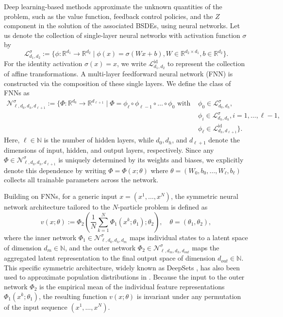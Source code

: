 \documentclass[11pt]{article}
\numberwithin{equation}{section}
\theoremstyle{plain}
\theoremstyle{definition}
\theoremstyle{remark}
\newcommand{\R}{\mathbb{R}}
\begin{document}
	Deep learning-based methods approximate the unknown quantities of the problem, such as the value function, feedback control policies, and the $Z$ component in the solution of the associated BSDEs, using neural networks.  Let us denote the collection of single-layer neural networks with activation function $\sigma$ by 
	\begin{equation*}
		\mathcal{L}_{d_1, d_2}^\sigma := \big\{ \phi:\R^{d_1} \to \R^{d_2}\mid \phi(x) = \sigma(Wx +b), W\in \R^{d_2\times d_1}, b\in \R^{d_2} \big\}. 
	\end{equation*}
	For the identity activation $\sigma(x)=x$, we write $\mathcal{L}_{d_1, d_2}^{\mathrm{id}}$ to represent the collection of affine transformations. A multi-layer feedforward neural network (FNN) is constructed via the composition of these single layers. We define the class of FNNs as 
	\begin{equation*}
		\begin{aligned}
			\mathcal{N}_{\ell, d_0, d_h, d_{\ell+1}}^\sigma := \big\{\Phi:\R^{d_0} \to \R^{d_{\ell+1}}\mid \Phi = \phi_\ell \circ \phi_{\ell-1} \circ \dots \circ \phi_0 \text{ with } &\phi_0 \in \mathcal{L}_{d_0,d_h}^\sigma, \\
			&\phi_{i} \in \mathcal{L}_{d_h,d_h}^\sigma, i=1,\dots, \ell-1, \\
			&\phi_\ell \in \mathcal{L}_{d_h, d_{\ell+1}}^{\mathrm{id}}\big\}.
		\end{aligned}
	\end{equation*}
	Here, $\ell \in \mathbb{N}$ is the number of hidden layers, while $d_0, d_h$, and $d_{\ell+1}$ denote the dimensions of input, hidden, and output layers, respectively. Since any $\Phi \in \mathcal{N}_{\ell, d_0, d_h, d_{\ell+1}}^\sigma$ is uniquely determined by its weights and biases, we explicitly denote this dependence by writing $\Phi = \Phi(x;\theta)$ where $\theta = (W_0, b_0, \dots, W_\ell, b_{\ell})$ collects all trainable parameters across the network. 
	
	Building on FNNs, for a generic input $x = (x^1, \dots, x^N)$, the symmetric neural network architecture tailored to the $N$-particle problem is defined as 
	\begin{equation} \label{eq:symmetric-nn}
		v(x;\theta) := \Phi_2\left(\frac{1}{N}\sum_{k=1}^N \Phi_1(x^k;\theta_1);\theta_2\right), \quad \theta = (\theta_1, \theta_2), 
	\end{equation}
	where the inner network $\Phi_1\in \mathcal{N}_{\ell, d_0, d_h, d_m}^\sigma$ maps individual states to a latent space of dimension $d_m\in \mathbb{N}$, and the outer network $\Phi_2 \in \mathcal{N}_{\ell, d_m, d_h, d_{out}}^\sigma$ maps the aggregated latent representation to the final output space of dimension $d_{out}\in \mathbb{N}$. This specific symmetric architecture, widely known as DeepSets \cite{germain2022deepsets}, has also been used to approximate population distributions in \cite{dayanikli2023deep}. Because the input to the outer network $\Phi_2$ is the empirical mean of the individual feature representations $\Phi_1(x^k; \theta_1)$, the resulting function $v(x;\theta)$ is invariant under any permutation of the input sequence $(x^1, \dots, x^N)$. 
	
\end{document}
